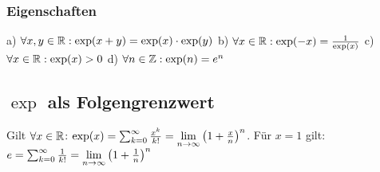 \subsubsection*{Eigenschaften}
    a) $\forall x, y \in \mathbb R: \exp(x + y) = \exp(x) \cdot \exp(y)$
    b) $\forall x \in \mathbb R: \exp(-x) = \frac{1}{\exp (x)}$
    c) $\forall x \in \mathbb R: \exp(x) > 0$
    d) $\forall n \in \mathbb Z: \exp(n) = e^{n}$ 
\subsection*{\texorpdfstring{$\exp$}{Exponentialfunktion} als Folgengrenzwert}
Gilt $\forall x \in \mathbb R$: $\exp(x) = \sum_{k = 0}^\infty \frac{x^k}{k!} = \lim\limits_{n \rightarrow \infty} \left(1 + \frac{x}{n}\right)^n$. Für $x = 1$ gilt: $e = \sum_{k = 0}^\infty \frac{1}{k!} = \lim\limits_{n \rightarrow \infty}\left(1 + \frac{1}{n}\right)^n$

